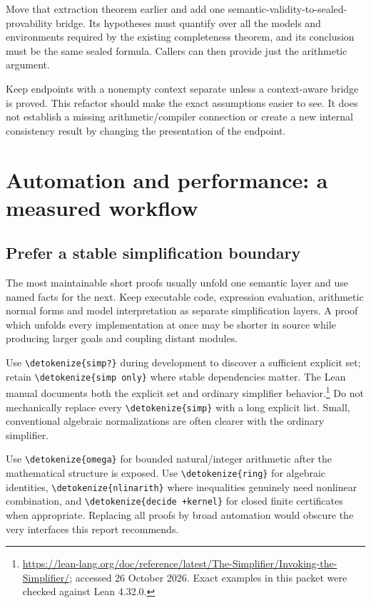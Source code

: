 \documentclass[11pt,letterpaper]{article}
\newcommand{\code}[1]{\expandafter\nolinkurl\expandafter{\detokenize{#1}}}
\begin{document}
Move that extraction theorem earlier and add one semantic-validity-to-sealed-provability bridge. Its hypotheses must quantify over all the models and environments required by the existing completeness theorem, and its conclusion must be the same sealed formula. Callers can then provide just the arithmetic argument.

Keep endpoints with a nonempty context separate unless a context-aware bridge is proved. This refactor should make the exact assumptions easier to see. It does not establish a missing arithmetic/compiler connection or create a new internal consistency result by changing the presentation of the endpoint.

\section{Automation and performance: a measured workflow}

\subsection{Prefer a stable simplification boundary}

The most maintainable short proofs usually unfold one semantic layer and use named facts for the next. Keep executable code, expression evaluation, arithmetic normal forms and model interpretation as separate simplification layers. A proof which unfolds every implementation at once may be shorter in source while producing larger goals and coupling distant modules.

Use \code{simp?} during development to discover a sufficient explicit set; retain \code{simp only} where stable dependencies matter. The Lean manual documents both the explicit set and ordinary simplifier behavior.\footnote{\url{https://lean-lang.org/doc/reference/latest/The-Simplifier/Invoking-the-Simplifier/}; accessed 26 October 2026. Exact examples in this packet were checked against Lean 4.32.0.} Do not mechanically replace every \code{simp} with a long explicit list. Small, conventional algebraic normalizations are often clearer with the ordinary simplifier.

Use \code{omega} for bounded natural/integer arithmetic after the mathematical structure is exposed. Use \code{ring} for algebraic identities, \code{nlinarith} where inequalities genuinely need nonlinear combination, and \code{decide +kernel} for closed finite certificates when appropriate. Replacing all proofs by broad automation would obscure the very interfaces this report recommends.
\end{document}
